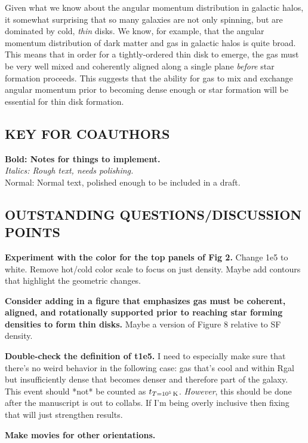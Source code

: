 \documentclass[fleqn,usenatbib]{mnras}
\newcommand{\tcon}{t_{T=10^5\,{\rm K}}}
\begin{document}
Given what we know about the angular momentum distribution in galactic halos, it somewhat surprising that so many galaxies are not only spinning, but are dominated by cold, {\em thin} disks.    We know, for example, that the angular momentum distribution of dark matter \citep{B01} and gas \citep{Stewart13,DeFelippis2020} in galactic halos is quite broad.  This means that in order for a tightly-ordered thin disk to emerge, the gas must be very well mixed and  coherently aligned along a single plane {\em before} star formation proceeds.  This suggests that the ability for gas to mix and exchange angular momentum prior to becoming dense enough or star formation will be essential for thin disk formation. 
 




\subsection{KEY FOR COAUTHORS}
\textbf{Bold: Notes for things to implement.} \\
\textit{Italics: Rough text, needs polishing.} \\
Normal: Normal text, polished enough to be included in a draft.

\subsection{OUTSTANDING QUESTIONS/DISCUSSION POINTS}

\textbf{Experiment with the color for the top panels of Fig 2.}
Change 1e5 to white.
Remove hot/cold color scale to focus on just density.
Maybe add contours that highlight the geometric changes.

\textbf{Consider adding in a figure that emphasizes gas must be coherent, aligned, and rotationally supported prior to reaching star forming densities to form thin disks.}
Maybe a version of Figure 8 relative to SF density.

\textbf{Double-check the definition of t1e5.}
I need to especially make sure that there's no weird behavior in the following case:
gas that's cool and within Rgal but insufficiently dense that becomes denser and therefore part of the galaxy.
This event should *not* be counted as $\tcon$.
\textit{However}, this should be done after the manuscript is out to collabs.
If I'm being overly inclusive then fixing that will just strengthen results.

\textbf{Make movies for other orientations.}
\end{document}
